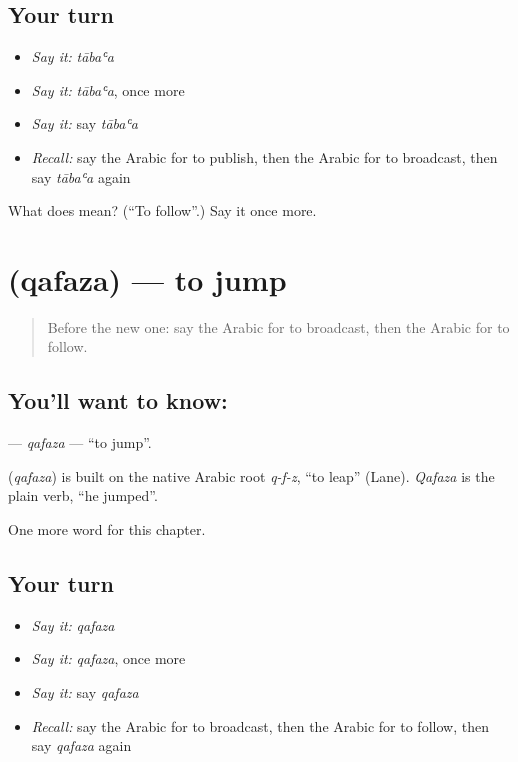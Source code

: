 \subsection*{Your turn}
\begin{itemize}
\raggedright
  \item \emph{Say it:} \emph{tābaʿa}
  \item \emph{Say it:} \emph{tābaʿa}, once more
  \item \emph{Say it:} say \emph{tābaʿa}
  \item \emph{Recall:} say the Arabic for to publish, then the Arabic for to broadcast, then say \emph{tābaʿa} again
\end{itemize}

\begin{tcolorbox}[breakable,colback=teal!4,colframe=teal!35!black,title={Before you move on}]
What does  mean? (\textquotedblleft{}To follow\textquotedblright{}.) Say it once more.
\end{tcolorbox}
\section[\texorpdfstring{\ar{قفز} (qafaza)}{قفز (qafaza)}]{ (qafaza) — to jump}

\label{lesson:AR-C259-qafaza}



\begin{quote}
Before the new one: say the Arabic for to broadcast, then the Arabic for to follow.
\end{quote}

\subsection*{You'll want to know: }
\textbf{} — \emph{qafaza} — \textquotedblleft{}to jump\textquotedblright{}.

\begin{cousinweb}
\textbf{} (\emph{qafaza}) is built on the native Arabic root \emph{q-f-z}, \textquotedblleft{}to leap\textquotedblright{} (Lane). \emph{Qafaza} is the plain verb, \textquotedblleft{}he jumped\textquotedblright{}.
\end{cousinweb}

\begin{grammarlens}[title={What you've built}]
One more word for this chapter.
\end{grammarlens}

\subsection*{Your turn}
\begin{itemize}
\raggedright
  \item \emph{Say it:} \emph{qafaza}
  \item \emph{Say it:} \emph{qafaza}, once more
  \item \emph{Say it:} say \emph{qafaza}
  \item \emph{Recall:} say the Arabic for to broadcast, then the Arabic for to follow, then say \emph{qafaza} again
\end{itemize}

